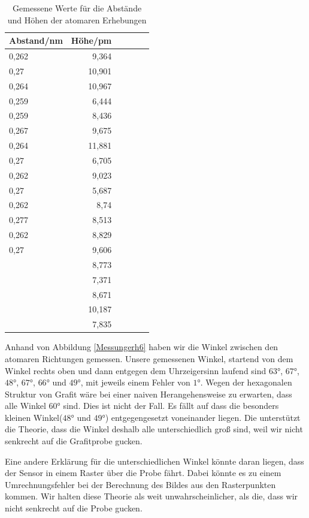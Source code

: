 \documentclass[10pt,a4paper]{article}
\begin{document}
\begin{table}[h!]
	\centering
	\begin{tabular}{|l|r|c|lrp{16cm}}\hline
		Abstand/nm & Höhe/pm\\\hline
		0,262 & 9,364 \\
		0,27 & 10,901 \\
		0,264 & 10,967\\
		0,259& 6,444 \\
		0,259 & 8,436 \\
		0,267 & 9,675 \\
		0,264 & 11,881\\
		0,27 & 6,705\\
		0,262 & 9,023\\
		0,27 & 5,687\\
		0,262 & 8,74\\
		0,277 & 8,513\\
		0,262 & 8,829\\
		0,27 & 9,606\\
		& 8,773\\
		& 7,371\\
		& 8,671\\
		& 10,187\\
		& 7,835\\
		\hline
	\end{tabular}
	\caption{Gemessene Werte für die Abstände und Höhen der atomaren Erhebungen}
	\label{Messungerh5}
\end{table}

Anhand von Abbildung \ref{Messungerh6} haben wir die Winkel zwischen den atomaren Richtungen gemessen. Unsere gemessenen Winkel, startend von dem Winkel rechts oben und dann entgegen dem Uhrzeigersinn laufend sind $63°$, $67°$, $48°$, $67°$, $66°$ und $49°$, mit jeweils einem Fehler von $1°$. Wegen der hexagonalen Struktur von Grafit wäre bei einer naiven Herangehensweise zu erwarten, dass alle Winkel $60°$ sind. Dies ist nicht der Fall. Es fällt auf dass die besonders kleinen Winkel($48°$ und $49°$) entgegengesetzt voneinander liegen. Die unterstützt die Theorie, dass die Winkel deshalb alle unterschiedlich groß sind, weil wir nicht senkrecht auf die Grafitprobe gucken.

 Eine andere Erklärung für die unterschiedlichen Winkel könnte daran liegen, dass der Sensor in einem Raster über die Probe fährt. Dabei könnte es zu einem Umrechnungsfehler bei der Berechnung des Bildes aus den Rasterpunkten kommen. Wir halten diese Theorie als weit unwahrscheinlicher, als die, dass wir nicht senkrecht auf die Probe gucken.
\end{document}
